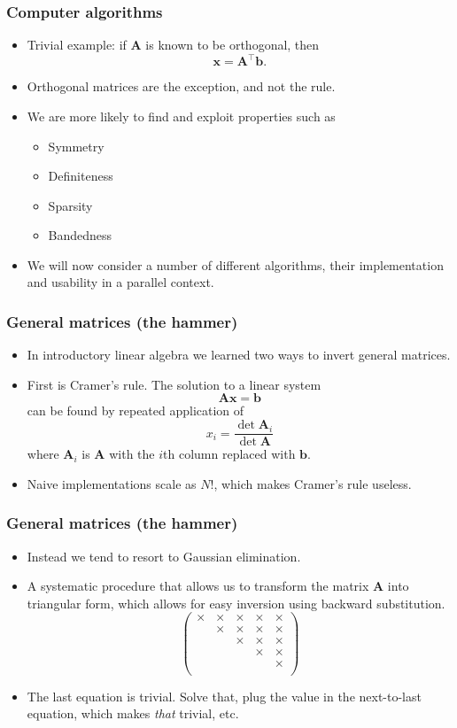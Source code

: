 \begin{frame}
  \frametitle{Computer algorithms}
  \begin{itemize}
  \item Trivial example: if $\bm A$ is known to be orthogonal, then
    \[ \bm x = \bm A^\intercal \bm b. \]
  \item Orthogonal matrices are the exception, and not the rule.
  \item We are more likely to find and exploit properties such as
    \begin{itemize}
    \item Symmetry
    \item Definiteness
    \item Sparsity
    \item Bandedness
    \end{itemize}
  \item We will now consider a number of different algorithms, their
    implementation and usability in a parallel context.
  \end{itemize}
\end{frame}

\begin{frame}
  \frametitle{General matrices (the hammer)}
  \begin{itemize}
  \item In introductory linear algebra we learned two ways to invert general
    matrices.
  \item First is Cramer's rule. The solution to  a linear system
    \[ \bm A \bm x = \bm b \]
    can be found by repeated application of
    \[ x_i = \frac{\det{\bm A_i}}{\det{\bm A}} \]
    where $\bm A_i$ is $\bm A$ with the $i$th column replaced with $\bm b$.
  \item Naive implementations scale as $N!$, which makes Cramer's rule useless.
  \end{itemize}
\end{frame}

\begin{frame}
  \frametitle{General matrices (the hammer)}
  \begin{itemize}
  \item Instead we tend to resort to Gaussian elimination.
  \item A systematic procedure that allows us to transform the matrix $\bm A$
    into triangular form, which allows for easy inversion using backward
    substitution.
    \[
      \begin{pmatrix}
        \times & \times & \times & \times & \times \\
        & \times & \times & \times & \times \\
        & & \times & \times & \times \\
        & & & \times & \times \\
        & & & & \times \\
      \end{pmatrix}
    \]
  \item The last equation is trivial. Solve that, plug the value in the
    next-to-last equation, which makes \emph{that} trivial, etc.
  \end{itemize}
\end{frame}

